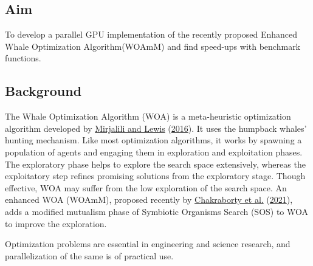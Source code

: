 \hypertarget{aim}{%
\subsection{Aim}\label{aim}}

To develop a parallel GPU implementation of the recently proposed
Enhanced Whale Optimization Algorithm(WOAmM) and find speed-ups with
benchmark functions.

\hypertarget{background}{%
\subsection{Background}\label{background}}

The Whale Optimization Algorithm (WOA) is a meta-heuristic optimization
algorithm developed by
\protect\hyperlink{ref-mirjaliliWhaleOptimizationAlgorithm2016}{Mirjalili
and Lewis}
(\protect\hyperlink{ref-mirjaliliWhaleOptimizationAlgorithm2016}{2016}).
It uses the humpback whales' hunting mechanism. Like most optimization
algorithms, it works by spawning a population of agents and engaging
them in exploration and exploitation phases. The exploratory phase helps
to explore the search space extensively, whereas the exploitatory step
refines promising solutions from the exploratory stage. Though
effective, WOA may suffer from the low exploration of the search space.
An enhanced WOA (WOAmM), proposed recently by
\protect\hyperlink{ref-chakrabortyNovelEnhancedWhale2021}{Chakraborty et
al.} (\protect\hyperlink{ref-chakrabortyNovelEnhancedWhale2021}{2021}),
adds a modified mutualism phase of Symbiotic Organisms Search (SOS) to
WOA to improve the exploration.

Optimization problems are essential in engineering and science research,
and parallelization of the same is of practical use.

\renewcommand\tcap{WOAmM General Equations}

